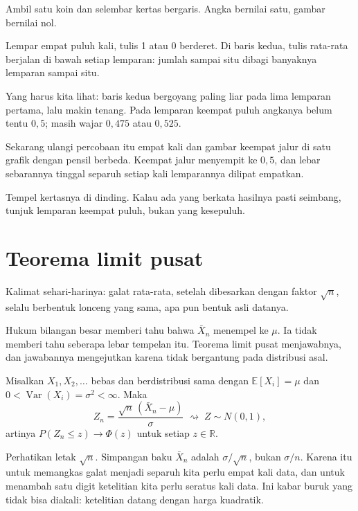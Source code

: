 \begin{tangan}
Ambil satu koin dan selembar kertas bergaris. Angka bernilai satu, gambar
bernilai nol.

Lempar empat puluh kali, tulis 1 atau 0 berderet. Di baris kedua, tulis
rata-rata berjalan di bawah setiap lemparan: jumlah sampai situ dibagi
banyaknya lemparan sampai situ.

Yang harus kita lihat: baris kedua bergoyang paling liar pada lima lemparan
pertama, lalu makin tenang. Pada lemparan keempat puluh angkanya belum tentu
$0{,}5$; masih wajar $0{,}475$ atau $0{,}525$.

Sekarang ulangi percobaan itu empat kali dan gambar keempat jalur di satu
grafik dengan pensil berbeda. Keempat jalur menyempit ke $0{,}5$, dan lebar
sebarannya tinggal separuh setiap kali lemparannya dilipat empatkan.

Tempel kertasnya di dinding. Kalau ada yang berkata hasilnya pasti seimbang,
tunjuk lemparan keempat puluh, bukan yang kesepuluh.
\end{tangan}

\section{Teorema limit pusat}

Kalimat sehari-harinya: galat rata-rata, setelah dibesarkan dengan faktor
$\sqrt n$, selalu berbentuk lonceng yang sama, apa pun bentuk asli datanya.

Hukum bilangan besar memberi tahu bahwa $\bar X_n$ menempel ke $\mu$. Ia tidak
memberi tahu seberapa lebar tempelan itu. Teorema limit pusat menjawabnya, dan
jawabannya mengejutkan karena tidak bergantung pada distribusi asal.


\begin{teorema}
Misalkan $X_1,X_2,\dots$ bebas dan berdistribusi sama dengan
$\mathbb{E}[X_i]=\mu$ dan $0<\operatorname{Var}(X_i)=\sigma^2<\infty$. Maka
\[
Z_n=\frac{\sqrt n\,(\bar X_n-\mu)}{\sigma}
\;\rightsquigarrow\; Z\sim N(0,1),
\]
artinya $P(Z_n\le z)\to\Phi(z)$ untuk setiap $z\in\mathbb{R}$.
\end{teorema}

Perhatikan letak $\sqrt n$. Simpangan baku $\bar X_n$ adalah
$\sigma/\sqrt n$, bukan $\sigma/n$. Karena itu untuk memangkas galat menjadi
separuh kita perlu empat kali data, dan untuk menambah satu digit ketelitian kita
perlu seratus kali data. Ini kabar buruk yang tidak bisa diakali: ketelitian
datang dengan harga kuadratik.

